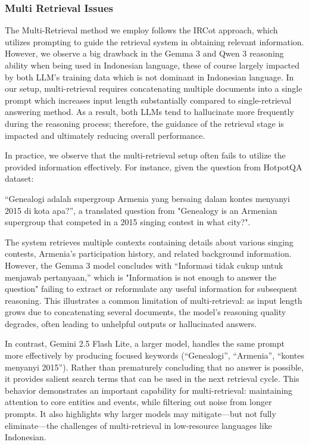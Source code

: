 \documentclass[times]{iapress}
\begin{document}
\subsubsection{Multi Retrieval Issues}
The Multi-Retrieval method we employ follows the IRCot approach, which utilizes prompting to guide the retrieval system in obtaining relevant information. However, we observe a big drawback in the Gemma 3 and Qwen 3 reasoning ability when being used in Indonesian language, these of course largely impacted by both LLM's training data which is not dominant in Indonesian language. In our setup, multi-retrieval requires concatenating multiple documents into a single prompt which increases input length substantially compared to single-retrieval answering method. As a result, both LLMs tend to hallucinate more frequently during the reasoning process; therefore, the guidance of the retrieval stage is impacted and ultimately reducing overall performance.

In practice, we observe that the multi-retrieval setup often fails to utilize the provided information effectively. For instance, given the question from HotpotQA dataset:

“Genealogi adalah supergroup Armenia yang bersaing dalam kontes menyanyi 2015 di kota apa?”, a translated question from "Genealogy is an Armenian supergroup that competed in a 2015 singing contest in what city?".

The system retrieves multiple contexts containing details about various singing contests, Armenia’s participation history, and related background information. However, the Gemma 3 model concludes with “Informasi tidak cukup untuk menjawab pertanyaan,” which is "Information is not enough to answer the question" failing to extract or reformulate any useful information for subsequent reasoning. This illustrates a common limitation of multi-retrieval: as input length grows due to concatenating several documents, the model’s reasoning quality degrades, often leading to unhelpful outputs or hallucinated answers.

In contrast, Gemini 2.5 Flash Lite, a larger model, handles the same prompt more effectively by producing focused keywords (“Genealogi”, “Armenia”, “kontes menyanyi 2015”). Rather than prematurely concluding that no answer is possible, it provides salient search terms that can be used in the next retrieval cycle. This behavior demonstrates an important capability for multi-retrieval: maintaining attention to core entities and events, while filtering out noise from longer prompts. It also highlights why larger models may mitigate—but not fully eliminate—the challenges of multi-retrieval in low-resource languages like Indonesian.
\end{document}
